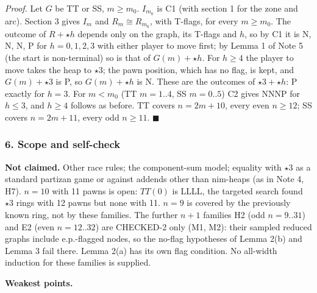 \emph{Proof.} Let $G$ be TT or SS, $m\ge m_0$. $I_{m_0}$ is C1 (with section 1 for the zone and arc). Section 3 gives $I_m$ and $R_m\cong R_{m_0}$, with T-flags, for every $m\ge m_0$. The outcome of $R+\star h$ depends only on the graph, its T-flags and $h$, so by C1 it is N, N, N, P for $h=0,1,2,3$ with either player to move first; by Lemma 1 of Note 5 (the start is non-terminal) so is that of $G(m)+\star h$. For $h\ge4$ the player to move takes the heap to $\star3$; the pawn position, which has no flag, is kept, and $G(m)+\star3$ is P, so $G(m)+\star h$ is N. These are the outcomes of $\star3+\star h$: P exactly for $h=3$. For $m<m_0$ (TT $m=1..4$, SS $m=0..5$) C2 gives NNNP for $h\le3$, and $h\ge4$ follows as before. TT covers $n=2m+10$, every even $n\ge12$; SS covers $n=2m+11$, every odd $n\ge11$. $\blacksquare$

\subsubsection*{6. Scope and self-check}
\textbf{Not claimed.} Other race rules; the component-sum model; equality with $\star3$ as a standard partizan game or against addends other than nim-heaps (as in Note 4, H7). $n=10$ with 11 pawns is open: $TT(0)$ is LLLL, the targeted search found $\star3$ rings with 12 pawns but none with 11. $n=9$ is covered by the previously known ring, not by these families. The further $n+1$ families H2 (odd $n=9..31$) and E2 (even $n=12..32$) are CHECKED-2 only (M1, M2): their sampled reduced graphs include e.p.-flagged nodes, so the no-flag hypotheses of Lemma 2(b) and Lemma 3 fail there. Lemma 2(a) has its own flag condition. No all-width induction for these families is supplied.

\textbf{Weakest points.}

